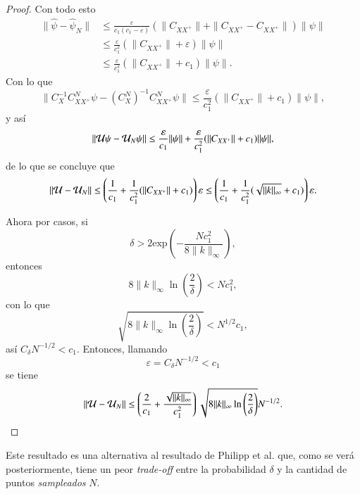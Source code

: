 \begin{proof}
    Con todo esto
    \[
    \begin{aligned}
        \| \hat{\psi} - \hat{\psi}_N \| & \leq \frac{\varepsilon}{c_1(c_1 - \varepsilon)}
    (\| C_{XX^+} \| + \| C_{XX^+} - C_{XX^+} \| ) \| \psi \| \\
    & \leq \frac{\varepsilon}{c_1^2}
    (\| C_{XX^+} \| + \varepsilon ) \| \psi \| \\
    & \leq \frac{\varepsilon}{c_1^2}
    (\| C_{XX^+} \| + c_1 ) \| \psi \|.
    \end{aligned}
    \]
    Con lo que
    \[
    \| C_X^{-1} C_{XX^+}^N \psi - \left (C_X^N \right )^{-1} C_{XX^+}^N \psi \| \leq \frac{\varepsilon}{c_1^2}
    (\| C_{XX^+} \| + c_1 ) \| \psi \|,
    \]
    y así
    \[
    \| \mathcal{U} \psi - \mathcal{U}_N \psi \| \leq \frac{\varepsilon}{c_1} \| \psi \| + \frac{\varepsilon}{c_1^2}
    (\| C_{XX^+} \| + c_1 ) \| \psi \|,
    \]
    de lo que se concluye que
    \[
    \| \mathcal{U} - \mathcal{U}_N \| \leq \left ( \frac{1}{c_1} + \frac{1}{c_1^2}
    (\| C_{XX^+} \| + c_1 ) \right ) \varepsilon \leq \left ( \frac{1}{c_1} + \frac{1}{c_1^2}
    (\sqrt{\| k \|_{\infty}} + c_1 ) \right ) \varepsilon.
    \]

    Ahora por casos, si
    \[
    \delta > 2\text{exp} \left ( - \frac{N c_1^2}{8 \| k \|_\infty} \right ),
    \]
    entonces
    \[
    8 \| k \|_{\infty} \ln \left ( \frac{2}{\delta} \right ) < N c_1^2,
    \]
    con lo que
    \[
    \sqrt{8 \| k \|_{\infty} \ln \left ( \frac{2}{\delta} \right )} < N^{1/2} c_1,
    \]
    así $C_\delta N^{-1/2} < c_1$. Entonces, llamando
    \[
    \varepsilon = C_\delta N^{-1/2} < c_1
    \]
    se tiene
     \[
    \| \mathcal{U} - \mathcal{U}_N \| \leq \left ( \frac{2}{c_1} + \frac{\sqrt{\| k \|_{\infty}}}{c_1^2}
  \right )\sqrt{8 \| k \|_\infty \ln \left ( \frac{2}{\delta}\right ) } N^{-1/2}.
    \]
\end{proof}

Este resultado es una alternativa al resultado de Philipp et al. que, como se verá posteriormente, tiene un peor \textit{trade-off} entre la probabilidad $\delta$ y la cantidad de puntos \textit{sampleados} $N$.


